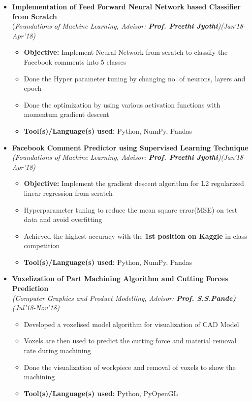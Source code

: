 \documentclass[a4paper,10pt]{article}
\begin{document}
\begin{itemize}
\item \textbf{Implementation of Feed Forward Neural Network based Classifier from Scratch} \\ 
(\emph{Foundations of Machine Learning, Advisor: \textbf{Prof. Preethi Jyothi})\hfill (Jan'18-Apr’18)} \\[-0.4cm]
	\begin{itemize}[noitemsep,nolistsep]
	\item \textbf{Objective:} Implement Neural Network from scratch to classify the Facebook comments into 5 classes %
    \item Done the Hyper parameter tuning by changing no. of neurons, layers and epoch
    \item Done the optimization by using various activation functions with momentum gradient descent
    \item \textbf{Tool(s)/Language(s) used:} Python, NumPy, Pandas
	\end{itemize}

\item \textbf{Facebook Comment Predictor using Supervised Learning Technique}\\
\emph{(Foundations of Machine Learning, Advisor: \textbf{Prof. Preethi Jyothi})\hfill (Jan'18-Apr’18)} \\[-0.4cm]
	\begin{itemize}[noitemsep,nolistsep]
    \item \textbf{Objective:} Implement the gradient descent algorithm for L2 regularized linear regression from scratch
    \item Hyperparameter tuning to reduce the mean square error(MSE) on test data and avoid overfitting
    \item Achieved the highest accuracy with the \textbf{1st position on Kaggle} in class competition
    \item \textbf{Tool(s)/Language(s) used:} Python, NumPy, Pandas
	\end{itemize}


\item \textbf{Voxelization of Part Machining Algorithm and Cutting Forces Prediction}\\
\emph{(Computer Graphics and Product Modelling, Advisor: \textbf{Prof. S.S.Pande)}\hfill (Jul'18-Nov’18)} \\[-0.4cm]
	\begin{itemize}[noitemsep,nolistsep]
    \item Developed a voxelised model algorithm for visualization of CAD Model
    \item Voxels are then used to predict the cutting force and material removal rate during machining
    \item Done the visualization of workpiece and removal of voxels to show the machining
    \item \textbf{Tool(s)/Language(s) used:} Python, PyOpenGL
	\end{itemize}
	

\end{itemize}
\end{document}
